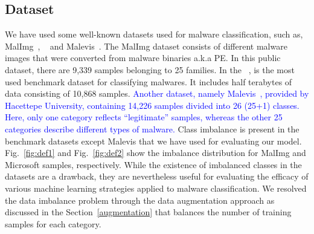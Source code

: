 \documentclass[pdflatex,sn-mathphys]{sn-jnl}%
\begin{document}
\subsection{Dataset}
\label{dataset}
We have used some well-known datasets used for malware classification, such as, MalImg~\cite{11}, ~\cite{10} and Malevis~\cite{39}. The MalImg dataset consists of different malware images that were converted from malware binaries a.k.a PE. In this public dataset, there are 9,339 samples belonging to 25 families. In the ~\cite{10}, is the most used benchmark dataset for classifying malwares. It includes half terabytes of data consisting of 10,868 samples. \textcolor{blue}{Another dataset, namely Malevis~\cite{39}, provided by Hacettepe University, containing 14,226 samples divided into 26 (25+1) classes. Here, only one category reflects ``legitimate'' samples, whereas the other 25 categories describe different types of malware.}
Class imbalance is present in the benchmark datasets except Malevis that we have used for evaluating our model. Fig.~\ref{fig:def1} and Fig.~\ref{fig:def2} show the imbalance distribution for MalImg and Microsoft samples, respectively. 
While the existence of imbalanced classes in the datasets are a drawback, they are nevertheless useful for evaluating the efficacy of various machine learning strategies applied to malware classification. We resolved the data imbalance problem through the data augmentation approach as discussed in the Section~\ref{augmentation} that balances the number of training samples for each category.
\end{document}
